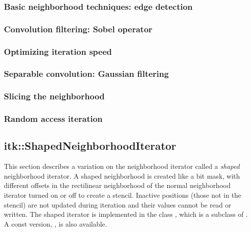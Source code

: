 {\subsubsection{Basic neighborhood techniques: edge detection}


\subsubsection{Convolution filtering: Sobel operator}


\subsubsection{Optimizing iteration speed}


\subsubsection{Separable convolution: Gaussian filtering}


\subsubsection{Slicing the neighborhood}


\subsubsection{Random access iteration}




\subsection{itk::ShapedNeighborhoodIterator}
\label{sec:itkShapedNeighborhoodIterator}

This section describes a variation on the neighborhood iterator called a
\emph{shaped} neighborhood iterator.  A shaped neighborhood is created like
a bit mask, with different offsets in the rectilinear neighborhood of
the normal neighborhood iterator turned on or off to create a stencil.
Inactive positions (those not in the stencil) are not updated during iteration and
their values cannot be read or written.  The shaped iterator is implemented in
the class , which is a subclass of
.  A const version,
, is also available.

}
